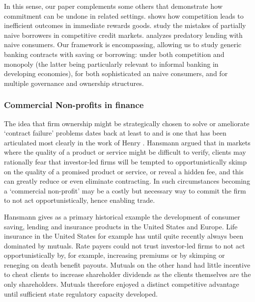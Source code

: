 \documentclass[11pt,english]{article}
\theoremstyle{plain}
\theoremstyle{definition}
\begin{document}
In this sense, our paper complements some others that demonstrate
how commitment can be undone in related settings. \citet{gottlieb_competition_2008}
shows how competition leads to inefficient outcomes in immediate rewards
goods. \citet{heidhues_exploiting_2010} study the mistakes of partially
naive borrowers in competitive credit markets. \citet{mendez_predatory_2012}
analyzes predatory lending with naive consumers. Our framework is
encompassing, allowing us to study generic banking contracts with
saving or borrowing: under both competition and monopoly (the latter
being particularly relevant to informal banking in developing economies),
for both sophisticated an naive consumers, and for multiple governance
and ownership structures.

\subsubsection{Commercial Non-profits in finance}

The idea that firm ownership might be strategically chosen to solve
or ameliorate `contract failure' problems dates back at least to \citet{arrow_uncertainty_1963}
and is one that has been articulated most clearly in the work of Henry
\citet{hansmann_ownership_1996}. Hansmann argued that in markets
where the quality of a product or service might be difficult to verify,
clients may rationally fear that investor-led firms will be tempted
to opportunistically skimp on the quality of a promised product or
service, or reveal a hidden fee, and this can greatly reduce or even
eliminate contracting. In such circumstances becoming a `commercial
non-profit' may be a costly but necessary way to commit the firm to
not act opportunistically, hence enabling trade.

Hansmann gives as a primary historical example the development of
consumer saving, lending and insurance products in the United States
and Europe. Life insurance in the United States for example has until
quite recently always been dominated by mutuals. Rate payers could
not trust investor-led firms to not act opportunistically by, for
example, increasing premiums or by skimping or reneging on death benefit
payouts. Mutuals on the other hand had little incentive to cheat clients
to increase shareholder dividends as the clients themselves are the
only shareholders. Mutuals therefore enjoyed a distinct competitive
advantage until sufficient state regulatory capacity developed.
\end{document}
